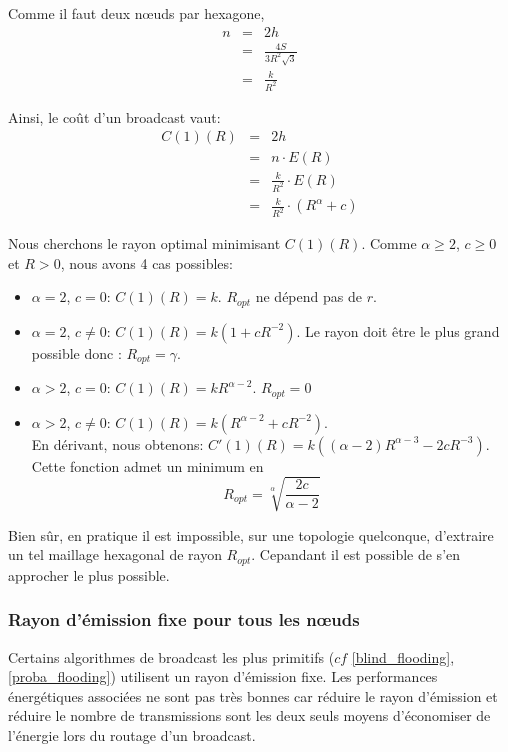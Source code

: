 Comme il faut deux nœuds par hexagone,
\begin{eqnarray*}
n & = & 2h \label{eq:3}\\
 & = & \frac{4S}{3R^2 \sqrt{3}}\\
 & = & \frac{k}{R^2}\label{eq:4}
\end{eqnarray*}

Ainsi, le coût d'un broadcast vaut:
\begin{eqnarray*}
C(1)(R) & = & 2h \label{eq:3}\\
 & = & n\cdot E(R)\\
 & = & \frac{k}{R^2}\cdot E(R)\\
 & = &  \frac{k}{R^2}\cdot (R^\alpha+c) \label{eq:4}
\end{eqnarray*}
 
Nous cherchons le rayon optimal minimisant $C(1)(R)$. Comme $\alpha\geq 2$, $c\geq 0$ et $R>0$, nous avons 4 cas possibles:
\begin{itemize}
 \item $\alpha=2$, $c=0$:  $C(1)(R)=k$. $R_{opt}$ ne dépend pas de $r$.
 \item $\alpha=2$, $c\neq0$: $C(1)(R)=k(1+cR^{-2})$. Le rayon doit être le plus grand possible donc : $R_{opt}=\gamma$.
 \item $\alpha>2$, $c=0$: $C(1)(R)=kR^{\alpha-2}$. $R_{opt}=0$
 \item $\alpha>2$, $c\neq 0$: $C(1)(R)=k(R^{\alpha-2} + c R^{-2} ) $.\\
 En dérivant, nous obtenons: $C'(1)(R)= k( (\alpha-2) R^{\alpha-3}- 2cR^{-3} ) $.\\
Cette fonction admet un minimum en $$R_{opt}=\sqrt[\alpha]{\frac{2c}{\alpha-2}}$$
\end{itemize}

Bien sûr, en pratique il est impossible, sur une topologie quelconque, d'extraire un tel maillage hexagonal de rayon $R_{opt}$. Cepandant il est possible de s'en approcher le plus possible.


\subsubsection{Rayon d'émission fixe pour tous les nœuds}
Certains algorithmes de broadcast les plus primitifs ($cf$ \ref{blind_flooding}, \ref{proba_flooding}) utilisent un rayon d'émission fixe. Les performances énergétiques associées ne sont pas très bonnes car réduire le rayon d'émission et réduire le nombre de transmissions sont les deux seuls moyens d'économiser de l'énergie lors du routage d'un broadcast.


